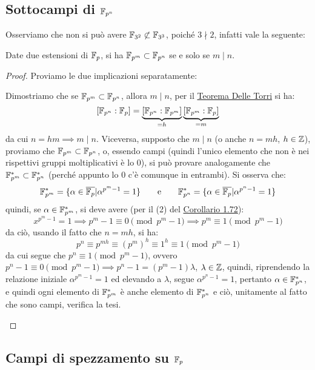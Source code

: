 \documentclass[11pt]{scrartcl}
\begin{document}
\newpage
\subsection{Sottocampi di $\mathbb{F}_{p^{n}}$}
Osserviamo che non si può avere $\mathbb{F}_{{3}^{2}} \not\subset \mathbb{F}_{{3}^{3}}$, poiché $3 \nmid 2$, infatti vale la seguente:
\begin{proposition}
	\label{cf:5.18}
	Date due estensioni di ${\mathbb F}_p$, si ha $\mathbb{F}_{{p}^{m}} \subset \mathbb{F}_{{p}^{n}}$ se e solo se $m \mid n$.
\end{proposition}

\begin{proof}
Proviamo le due implicazioni separatamente:
	\begin{itemize}
		\ii Dimostriamo che se $\mathbb{F}_{{p}^{m}} \subset \mathbb{F}_{{p}^{n}}$, allora $m \mid n$, per il \hyperref[es:Torri]{Teorema Delle Torri}
		si ha:
			\[[\mathbb{F}_{{p}^{n}} : {\mathbb F}_p] = \underbrace{[\mathbb{F}_{{p}^{n}}:\mathbb{F}_{{p}^{m}}]}_{=h}\underbrace{[\mathbb{F}_{{p}^{m}}: {\mathbb F}_p]}_{=m}
				\]
		da cui $n = hm \implies m \mid n$.
		\ii Viceversa, supposto che $m \mid n$ (o anche $n = mh$, $h \in \mathbb Z$), proviamo che $\mathbb{F}_{{p}^{m}} \subset \mathbb{F}_{{p}^{n}}$, o, essendo campi (quindi l'unico elemento che
		 non è nei rispettivi gruppi moltiplicativi è lo 0), si può provare analogamente che $\mathbb{F}_{{p}^{m}}^* \subset \mathbb{F}_{{p}^{n}}^*$ (perché appunto lo 0 c'è comunque in entrambi).
		  Si osserva che:
			\[ \mathbb{F}_{{p}^{m}}^* = \{\alpha \in \overline{{\mathbb F}_p} | \alpha^{p^m-1} = 1\}
			\qquad
			\text e
			\qquad
			\mathbb{F}_{{p}^{n}}^* = \{\alpha \in \overline{{\mathbb F}_p} | \alpha^{p^n-1} = 1\}
				\]
			quindi, se $\alpha \in \mathbb{F}_{{p}^{m}}^*$, si deve avere (per il (2) del \hyperref[g:OrdLagrange]{Corollario 1.72}):
				\[ x^{p^m-1} = 1 \implies p^m-1 \equiv 0 \pmod{p^m-1} \implies p^m \equiv 1 \pmod{p^m-1}
					\]
			da ciò, usando il fatto che $n=mh$, si ha:
				\[ p^n \equiv p^{mh} \equiv (p^m)^h \equiv 1^h \equiv 1 \pmod{p^m-1}
					\]
			da cui segue che $p^n \equiv 1 \pmod{p^m-1}$, ovvero $p^n - 1 \equiv 0 \pmod{p^m-1} \implies p^n-1 = (p^m-1)\lambda$, $\lambda \in \mathbb Z$, quindi,
			 riprendendo la relazione iniziale $\alpha^{p^m-1} = 1$ ed elevando a $\lambda$, segue $\alpha^{p^n-1} = 1$,
			pertanto $\alpha \in \mathbb{F}_{{p}^{n}}^*$, e quindi ogni elemento di $\mathbb{F}_{{p}^{m}}^*$ è anche elemento di $\mathbb{F}_{{p}^{n}}^*$ e ciò, unitamente al fatto che sono campi,
			verifica la tesi.
	\end{itemize}
\end{proof}

\newpage
\subsection{Campi di spezzamento su ${\mathbb F}_p$}
\end{document}
